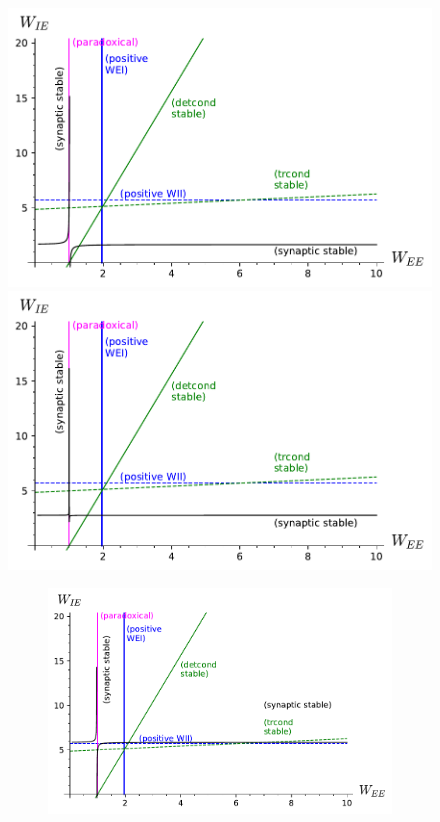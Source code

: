 \documentclass[twocolumn]{article}
\begin{document}
\begin{figure}[!ht]
\centering
\parbox[c]{\columnwidth}{
\includegraphics[width=\columnwidth]{SS_stability.pdf}
\includegraphics[width=\columnwidth]{SS_stability_slowExc.pdf}}
\parbox[c]{\columnwidth}{
\begin{figure}[H]
\includegraphics[width=\columnwidth]{SS_stability_slowInh.pdf}

\end{figure}}
\end{figure}
\end{document}
